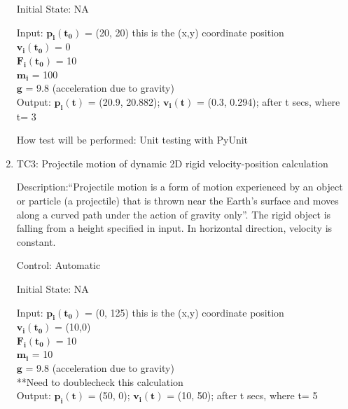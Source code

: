 \documentclass[12pt, titlepage]{article}
\begin{document}
\begin{enumerate}
Initial State: NA
					
Input: $\mathbf{p_i}$$\mathbf{(t_0)}$ = (20, 20) this is the (x,y) coordinate position\\
	   \hspace*{1.3cm}$\mathbf{v_i}$$\mathbf{(t_0)}$ = 0\\
	   \hspace*{1.3cm}$\mathbf{F_i}$$\mathbf{(t_0)}$ = 10\\
	   \hspace*{1.3cm}$\mathbf{m_i}$$ \mathbf{}$ = 100\\
	   \hspace*{1.3cm}$\mathbf{g}$$\mathbf{}$ = 9.8 (acceleration due to gravity)\\
	   
	  
Output: $\mathbf{p_i}$$\mathbf{(t)}$ = (20.9, 20.882);
		$\mathbf{v_i}$$\mathbf{(t)}$ = (0.3, 0.294); after t secs, where t= 3 
					
How test will be performed: Unit testing with PyUnit


\item{TC3: Projectile motion of dynamic 2D rigid velocity-position calculation\\}

Description:``Projectile motion is a form of motion experienced by an object or particle (a projectile) that is thrown near the Earth's surface and moves along a curved path under the action of gravity only''. The rigid object is falling from a height specified in input. In horizontal direction, velocity is constant.

Control: Automatic

Initial State: NA

Input: $\mathbf{p_i}$$\mathbf{(t_0)}$ = (0, 125) this is the (x,y) coordinate position\\
\hspace*{1.3cm}$\mathbf{v_i}$$\mathbf{(t_0)}$ = (10,0)\\
\hspace*{1.3cm}$\mathbf{F_i}$$\mathbf{(t_0)}$ = 10\\
\hspace*{1.3cm}$\mathbf{m_i}$$ \mathbf{}$ = 10\\
\hspace*{1.3cm}$\mathbf{g}$$\mathbf{}$ = 9.8 (acceleration due to gravity)\\
**Need to doublecheck this calculation\\
Output: $\mathbf{p_i}$$\mathbf{(t)}$ = (50, 0);
$\mathbf{v_i}$$\mathbf{(t)}$ = (10, 50); after t secs, where t= 5 


\end{enumerate}
\end{document}
